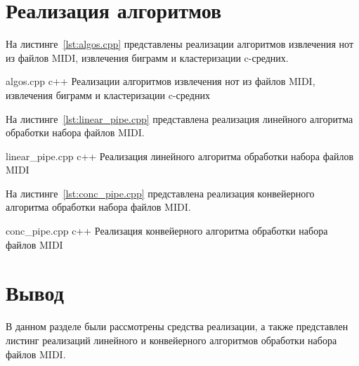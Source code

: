 \section{Реализация алгоритмов}

На листинге~\ref{lst:algos.cpp} представлены реализации алгоритмов извлечения нот из файлов MIDI, извлечения биграмм и кластеризации c-средних.

	{algos.cpp}
	{c++}
	{Реализации алгоритмов извлечения нот из файлов MIDI, извлечения биграмм и кластеризации c-средних}

На листинге~\ref{lst:linear_pipe.cpp} представлена реализация линейного алгоритма обработки набора файлов MIDI.

	{linear_pipe.cpp}
	{c++}
	{Реализация линейного алгоритма обработки набора файлов MIDI}

На листинге~\ref{lst:conc_pipe.cpp} представлена реализация конвейерного алгоритма обработки набора файлов MIDI.

	{conc_pipe.cpp}
	{c++}
	{Реализация конвейерного алгоритма обработки набора файлов MIDI}
	
\section*{Вывод}

В данном разделе были рассмотрены средства реализации, а также представлен листинг реализаций линейного и конвейерного алгоритмов обработки набора файлов MIDI.